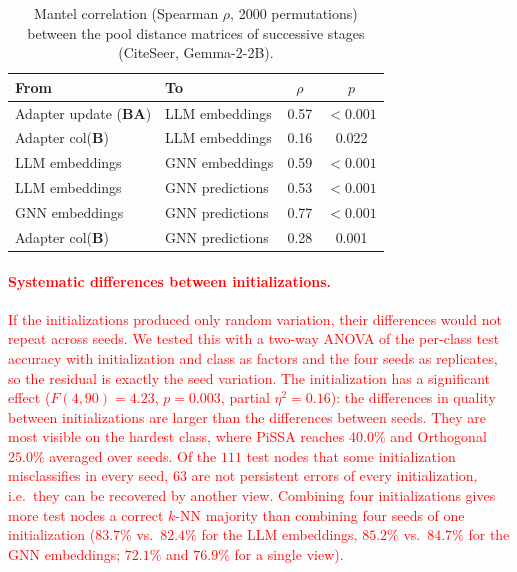 \documentclass[a4paper,fleqn]{cas-sc}
\newcommand{\revone}[1]{\textcolor{red}{#1}}   %
\begin{document}
\begin{table}[htbp]
\centering\color{blue}
\caption{Mantel correlation (Spearman $\rho$, 2000 permutations) between the pool distance matrices of successive stages (CiteSeer, Gemma-2-2B).}
\label{tab:mantel}
\small
\begin{tabular}{llcc}
\toprule
\textbf{From} & \textbf{To} & \textbf{$\rho$} & \textbf{$p$} \\
\midrule
Adapter update ($\mathbf{B}\mathbf{A}$) & LLM embeddings  & 0.57 & $<0.001$ \\
Adapter col($\mathbf{B}$)               & LLM embeddings  & 0.16 & 0.022 \\
LLM embeddings                          & GNN embeddings  & 0.59 & $<0.001$ \\
LLM embeddings                          & GNN predictions & 0.53 & $<0.001$ \\
GNN embeddings                          & GNN predictions & 0.77 & $<0.001$ \\
Adapter col($\mathbf{B}$)               & GNN predictions & 0.28 & 0.001 \\
\bottomrule
\end{tabular}
\end{table}

\paragraph{\revone{Systematic differences between initializations.}}
\revone{If the initializations produced only random variation, their differences would not repeat across seeds. We tested this with a two-way ANOVA of the per-class test accuracy with initialization and class as factors and the four seeds as replicates, so the residual is exactly the seed variation. The initialization has a significant effect ($F(4,90)=4.23$, $p=0.003$, partial $\eta^2=0.16$): the differences in quality between initializations are larger than the differences between seeds. They are most visible on the hardest class, where PiSSA reaches $40.0\%$ and Orthogonal $25.0\%$ averaged over seeds. Of the $111$ test nodes that some initialization misclassifies in every seed, $63$ are not persistent errors of every initialization, i.e.\ they can be recovered by another view. Combining four initializations gives more test nodes a correct $k$-NN majority than combining four seeds of one initialization ($83.7\%$ vs.\ $82.4\%$ for the LLM embeddings, $85.2\%$ vs.\ $84.7\%$ for the GNN embeddings; $72.1\%$ and $76.9\%$ for a single view).}
\end{document}
